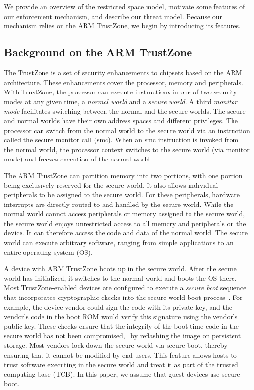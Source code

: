 \label{section:usagemodel}

We provide an overview of the restricted space model, motivate some features of
our enforcement mechanism, and describe our threat model. Because our mechanism
relies on the ARM TrustZone, we begin by introducing its features.

\subsection{Background on the ARM TrustZone}
\label{section:armback}

The TrustZone is a set of security enhancements to chipsets based on the ARM
architecture. These enhancements cover the processor, memory and peripherals.
With TrustZone, the processor can execute instructions in one of two security
modes at any given time, a \textit{normal world} and a \textit{secure world}. A
third \textit{monitor mode} facilitates switching between the normal and the
secure worlds.  The secure and normal worlds have their own address spaces and
different privileges.  The processor can switch from the normal world to the
secure world via an instruction called the secure monitor call (\textsf{smc}).
When an \textsf{smc} instruction is invoked from the normal world, the
processor context switches to the secure world (via monitor mode) and freezes
execution of the normal world.

The ARM TrustZone can partition memory into two portions, with one portion
being exclusively reserved for the secure world. It also allows individual
peripherals to be assigned to the secure world.  For these peripherals,
hardware interrupts are directly routed to and handled by the secure world.
While the normal world cannot access peripherals or memory assigned to the
secure world, the secure world enjoys unrestricted access to all memory and
peripherals on the device. It can therefore access the code and data of the
normal world. The secure world can execute arbitrary software, ranging from
simple applications to an entire operating system (OS).
%

A device with ARM TrustZone boots up in the secure world. After the secure
world has initialized, it switches to the normal world and boots the OS there.
Most TrustZone-enabled devices are configured to execute a \textit{secure boot}
sequence that incorporates cryptographic checks into the secure world boot
process~\cite[\S5.2.2]{armtz}. For example, the device vendor could sign the
code with its private key, and the vendor's code in the boot ROM would verify
this signature using the vendor's public key. These checks ensure that the
integrity of the boot-time code in the secure world has not been compromised,
\eg~by reflashing the image on persistent storage. Most vendors lock down the
secure world via secure boot, thereby ensuring that it cannot be modified by
end-users. This feature allows hosts to trust software executing in the secure
world and treat it as part of the trusted computing base (TCB). In this paper,
we assume that guest devices use secure boot.

